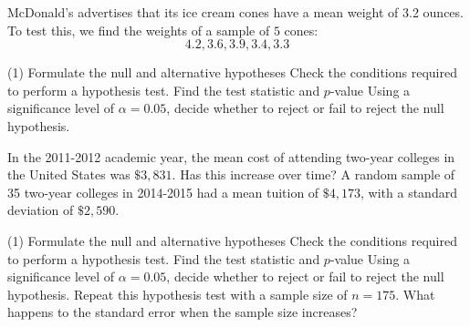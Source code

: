 \documentclass[../mathNotesPreamble]{subfiles}
\begin{document}
  \begin{ex*}
    McDonald's advertises that its ice cream cones have a mean weight of 3.2 ounces. To test this, we find the weights of a sample of $5$ cones:
      \[4.2, 3.6, 3.9, 3.4, 3.3\]
  \end{ex*}
  \begin{extasks}[after-item-skip=\stretch{1}](1)
    \task Formulate the null and alternative hypotheses
    \task Check the conditions required to perform a hypothesis test.
    \task Find the test statistic and $p$-value
    \task Using a significance level of $\alpha=0.05$, decide whether to reject or fail to reject the null hypothesis.
  \end{extasks}
  \pagebreak

  \begin{ex*}
    In the 2011-2012 academic year, the mean cost of attending two-year colleges in the United States was $\$3,831$. Has this increase over time? A random sample of 35 two-year colleges in 2014-2015 had a mean tuition of $\$4,173$, with a standard deviation of $\$2,590$.
  \end{ex*}
  \begin{extasks}[after-item-skip=\stretch{1}](1)
    \task Formulate the null and alternative hypotheses
    \task Check the conditions required to perform a hypothesis test.
    \task Find the test statistic and $p$-value
    \task Using a significance level of $\alpha=0.05$, decide whether to reject or fail to reject the null hypothesis.
    \task Repeat this hypothesis test with a sample size of $n=175$. What happens to the standard error when the sample size increases?
  \end{extasks}

  \pagebreak
\end{document}
